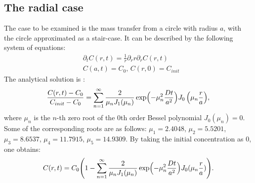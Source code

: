 \documentclass[review,12pt]{elsarticle}
\newcommand{\beq}{\begin{equation}}
\newcommand{\feq}{\end{equation}}
\begin{document}
\subsection{The radial case}
The case to be examined  is the mass transfer from a circle with radius $a$, with the circle approximated as a stair-case. It
can be described by the following system of equations:
\beq
\begin{aligned}
&\partial_t C(r,t)=\frac{1}{r}\partial_r r \partial_r C(r,t)\\
&C(a,t)=C_0,\,C(r,0)=C_{init}
\end{aligned}
\feq 
The analytical solution is \cite{chemical-correlations}:
\beq
\frac{C(r,t)-C_{0}}{C_{init}-C_{0}}=\sum_{n=1}^{\infty}{\frac{2}{\mu_n
J_1(\mu_n)}\exp\Bigl(-\mu_n^2 \frac{D t}{a^2} \Bigr)J_0\left(\mu_n \frac{r}{a}\right)},
\feq
where $\mu_n$ is the $n$-th zero root of the $0$th order Bessel polynomial $J_0(\mu_n)=0$. Some of
the corresponding roots are as follows: $\mu_1=2.4048$, $\mu_2=5.5201$, $\mu_3=8.6537$,
$\mu_4=11.7915$, $\mu_5=14.9309$.
By taking the initial concentration as $0$, one obtains:
\beq
\label{eq:analytical:profile:radial:case}
C(r,t)=C_0 \Biggl(1 - \sum_{n=1}^{\infty}{\frac{2}{\mu_n
J_1(\mu_n)}\exp\Bigl(-\mu_n^2 \frac{D t}{a^2} \Bigr)J_0(\mu_n \frac{r}{a})}\Biggr).
\feq
\end{document}

